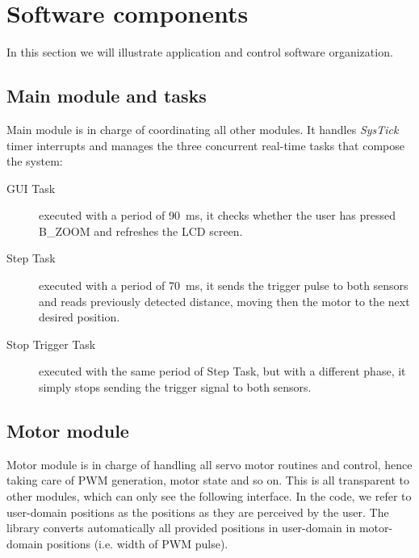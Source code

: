 \section{Software components}

In this section we will illustrate application and control software organization.

\subsection{Main module and tasks}

Main module is in charge of coordinating all other modules. It handles {\em SysTick} timer interrupts and manages the three concurrent real-time tasks that compose the system:

\begin{description}
    \item[GUI Task] executed with a period of \SI{90}{\milli\second}, it checks whether the user has pressed B\_ZOOM and refreshes the LCD screen.
    \item[Step Task] executed with a period of \SI{70}{\milli\second}, it sends the trigger pulse to both sensors and reads previously detected distance, moving then the motor to the next desired position.
    \item[Stop Trigger Task]  executed with the same period of Step Task, but with a different phase, it simply stops sending the trigger signal to both sensors.
\end{description}


\subsection{Motor module}

Motor module is in charge of handling all servo motor routines and control, hence taking care of PWM generation, motor state and so on. This is all transparent to other modules, which can only see the following interface. In the code, we refer to user-domain positions as the positions as they are perceived by the user. The library converts automatically all provided positions in user-domain in motor-domain positions (i.e. width of PWM pulse).


